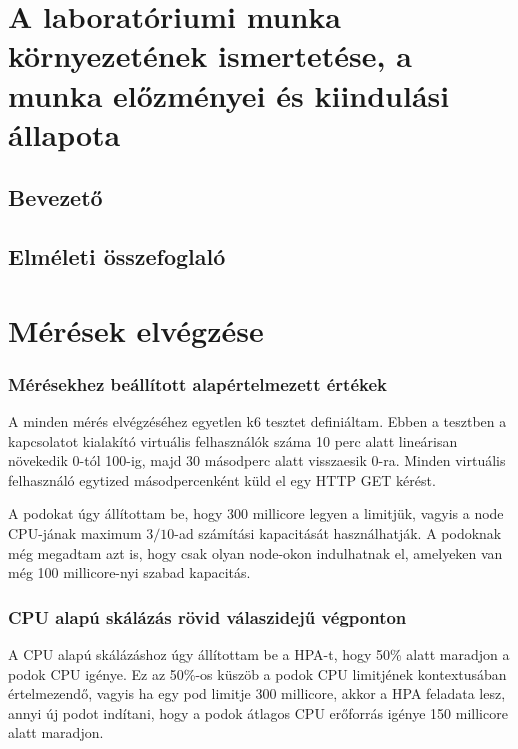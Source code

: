 \documentclass[a4paper,oneside]{article}
\begin{document}
\section{A laboratóriumi munka környezetének ismertetése,
     a munka előzményei és kiindulási állapota}
\label{sec:kornyezet}
\subsection{Bevezető}
\label{sec:bevezeto}

\subsection{Elméleti összefoglaló}

\newpage
\section{Mérések elvégzése}
\label{sec:az-elvegzett-munka}

\subsubsection{Mérésekhez beállított alapértelmezett értékek}

A minden mérés elvégzéséhez egyetlen k6 tesztet definiáltam. Ebben a tesztben
a kapcsolatot kialakító virtuális felhasználók száma 10 perc alatt lineárisan növekedik
0-tól 100-ig, majd 30 másodperc alatt visszaesik 0-ra. Minden virtuális
felhasználó egytized másodpercenként küld el egy HTTP GET kérést.

A podokat úgy állítottam be, hogy 300 millicore legyen a limitjük, vagyis a
node CPU-jának maximum $3/10$-ad számítási kapacitását használhatják. A
podoknak még megadtam azt is, hogy csak olyan node-okon indulhatnak el,
amelyeken van még 100 millicore-nyi szabad kapacitás.

\subsubsection{CPU alapú skálázás rövid válaszidejű végponton}
\label{secsec:cpu_scaling}

A CPU alapú skálázáshoz úgy állítottam be a HPA-t, hogy 50\% alatt maradjon a
podok CPU igénye. Ez az 50\%-os küszöb a podok CPU limitjének kontextusában
értelmezendő, vagyis ha egy pod limitje 300 millicore, akkor a HPA feladata
lesz, annyi új podot indítani, hogy a podok átlagos CPU erőforrás igénye 150
millicore alatt maradjon.
\end{document}
